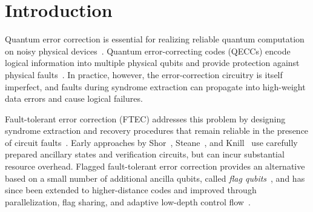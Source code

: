 \documentclass[acmsmall,screen,review,anonymous,nonacm]{acmart}
\newcommand{\showcomment}[1]{#1}
\newcommand{\bw}[1]{\showcomment{\textcolor{green}{\textbf{BW:} #1}}}
\begin{document}
\section{Introduction}

Quantum error correction is essential for realizing reliable quantum
computation on noisy physical devices~\cite{Shor96}. Quantum error-correcting
codes (QECCs) encode logical information into multiple physical qubits and
provide protection against physical faults~\cite{CS96,Ste96}. 
In practice, however, the error-correction
circuitry is itself imperfect, and faults during syndrome extraction can
propagate into high-weight data errors and cause logical failures.


Fault-tolerant error correction (FTEC) addresses this problem by designing
syndrome extraction and recovery procedures that remain reliable in the
presence of circuit faults~\cite{Shor96,AGP06,CDT09:CCS:2011814.2011815}.
Early approaches by Shor~\cite{Shor96}, Steane~\cite{Steane97}, and Knill~\cite{Knill05}
use carefully prepared ancillary states and verification circuits, but can
incur substantial resource overhead.
Flagged fault-tolerant error correction
provides an alternative based on a small number of additional ancilla qubits,
called \emph{flag qubits}~\cite{CR18a,CR18b}, and has since been extended to
higher-distance codes and improved through parallelization, flag sharing, and
adaptive low-depth control flow~\cite{CB18,reichardt2021fault,LL23,Liou25,Du24,low-depth}.



\end{document}
